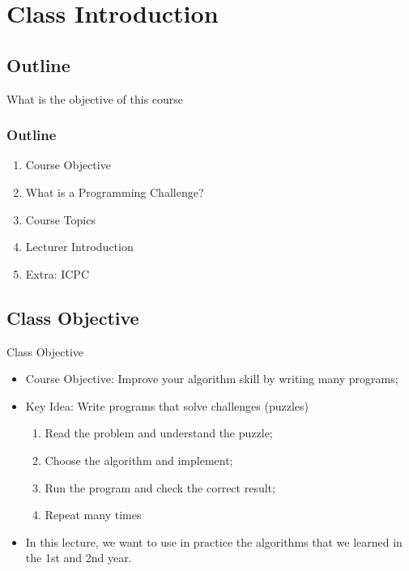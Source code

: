 
\section{Class Introduction}
\subsection{Outline}

\begin{frame}
  \centering
  {\huge
    What is the objective of this course
  }
\end{frame}

\begin{frame}
  \frametitle{Outline}
  \begin{enumerate}
    \item Course Objective
    \item What is a Programming Challenge?
    \item Course Topics
    \item Lecturer Introduction
    \item Extra: ICPC
  \end{enumerate}
\end{frame}

\subsection{Class Objective}
\begin{frame}{Class Objective}
  \begin{itemize}
    \item Course Objective: \alert{Improve your algorithm skill by writing many programs};
    \bigskip

    \item \alert{Key Idea:} Write programs that solve challenges (puzzles)
    \begin{enumerate}
      \item Read the problem and understand the puzzle;
      \item Choose the algorithm and implement;
      \item Run the program and check the correct result;
      \item Repeat many times
    \end{enumerate}
    \medskip

    \item In this lecture, we want to \alert{use in practice} the algorithms that we
    learned in the 1st and 2nd year.
  \end{itemize}
\end{frame}

